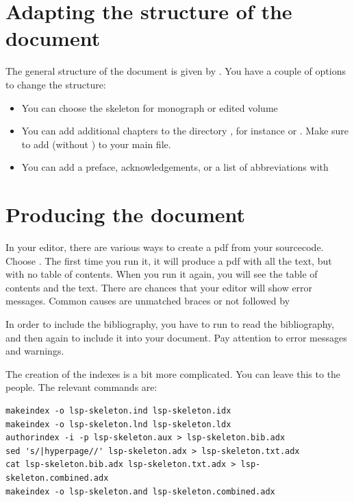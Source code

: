 \section{Adapting the structure of the document}
The general structure of the document is given by \lsp. You have a couple of options to change the structure:
\begin{itemize}
 \item You can choose the skeleton for monograph or edited volume
 \item You can add additional chapters to the directory , for instance  or . Make sure to add  (without ) to your main file.
 \item You can add a preface, acknowledgements, or a list of abbreviations with 
\end{itemize}


\section{Producing the document}
In your \latex editor, there are various ways to create a pdf from your sourcecode. Choose . The first time you run it, it will produce a pdf with all the text, but with no table of contents. When you run it again, you will see the table of contents and the text. There are chances that your editor will show error messages. Common causes are unmatched braces or  not followed by 

In order to include the bibliography, you have to run  to read the bibliography, and then again  to include it into your document. Pay attention to error messages and warnings.

The creation of the indexes is a bit more complicated. You can leave this to the \lsp people. The relevant commands are:

\begin{verbatim}
makeindex -o lsp-skeleton.ind lsp-skeleton.idx
makeindex -o lsp-skeleton.lnd lsp-skeleton.ldx 
authorindex -i -p lsp-skeleton.aux > lsp-skeleton.bib.adx
sed 's/|hyperpage//' lsp-skeleton.adx > lsp-skeleton.txt.adx 
cat lsp-skeleton.bib.adx lsp-skeleton.txt.adx > lsp-skeleton.combined.adx 
makeindex -o lsp-skeleton.and lsp-skeleton.combined.adx
\end{verbatim}

